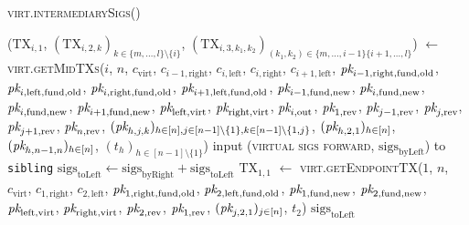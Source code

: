 \begin{center}
  \begin{processbox}{\textsc{virt.intermediarySigs}()}
    \begin{algorithmic}[1]
      \State ($\mathrm{TX}_{i, 1}$, $(\mathrm{TX}_{i, 2, k})_{k \in \{m, \dots,
      l\} \setminus \{i\}}$, $(\mathrm{TX}_{i, 3, k_1, k_2})_{(k_1, k_2) \in
      \{m, \dots, i-1\} \{i+1, \dots, l\}}$) $\gets$
      \textsc{virt.getMidTXs}($i$, $n$, $c_{\mathrm{virt}}$, $c_{i-1,
      \mathrm{right}}$, $c_{i, \mathrm{left}}$, $c_{i, \mathrm{right}}$,
      $c_{i+1, \mathrm{left}}$, $\textit{pk}_{i-1, \mathrm{right}, \mathrm{fund},
      \mathrm{old}}$, $\textit{pk}_{i, \mathrm{left}, \mathrm{fund}, \mathrm{old}}$,
      $\textit{pk}_{i, \mathrm{right}, \mathrm{fund}, \mathrm{old}}$, $\textit{pk}_{i+1,
      \mathrm{left}, \mathrm{fund}, \mathrm{old}}$, $\textit{pk}_{i-1, \mathrm{fund},
      \mathrm{new}}$, $\textit{pk}_{i, \mathrm{fund}, \mathrm{new}}$, $\textit{pk}_{i,
      \mathrm{fund}, \mathrm{new}}$, $\textit{pk}_{i+1, \mathrm{fund}, \mathrm{new}}$,
      $\textit{pk}_{\mathrm{left}, \mathrm{virt}}$, $\textit{pk}_{\mathrm{right}, \mathrm{virt}}$,
      $\textit{pk}_{i, \mathrm{out}}$, $\textit{pk}_{1, \mathrm{rev}}$, $\textit{pk}_{j-1, \mathrm{rev}}$,
      $\textit{pk}_{j, \mathrm{rev}}$, $\textit{pk}_{j+1, \mathrm{rev}}$, $\textit{pk}_{n, \mathrm{rev}}$,
      $(\textit{pk}_{h,j,k})_{h \in [n], j \in [n-1] \setminus \{1\}, k \in [n-1]
      \setminus \{1, j\}}$, $(\textit{pk}_{h, 2, 1})_{h \in [n]}$, $(\textit{pk}_{h, n-1, n})_{h
      \in [n]}$, $(t_h)_{h \in [n-1] \setminus \{1\}}$)
      \State {}
      \State input (\textsc{virtual sigs forward},
      $\mathrm{sigs}_{\mathrm{byLeft}}$) to \texttt{sibling}
      \State {}
      \State $\mathrm{sigs}_{\mathrm{toLeft}} \gets
      \mathrm{sigs}_{\mathrm{byRight}} + \mathrm{sigs}_{\mathrm{toLeft}}$
       
        \State $\mathrm{TX}_{1, 1}$ $\gets$ \textsc{virt.getEndpointTX}($1$,
        $n$, $c_{\mathrm{virt}}$, $c_{1, \mathrm{right}}$, $c_{2,
        \mathrm{left}}$, $\textit{pk}_{1, \mathrm{right}, \mathrm{fund}, \mathrm{old}}$,
        $\textit{pk}_{2, \mathrm{left}, \mathrm{fund}, \mathrm{old}}$, $\textit{pk}_{1,
        \mathrm{fund}, \mathrm{new}}$, $\textit{pk}_{2, \mathrm{fund}, \mathrm{new}}$,
        $\textit{pk}_{\mathrm{left}, \mathrm{virt}}$, $\textit{pk}_{\mathrm{right},
        \mathrm{virt}}$, $\textit{pk}_{2, \mathrm{rev}}$, $\textit{pk}_{1, \mathrm{rev}}$,
        $(\textit{pk}_{j, 2, 1})_{j \in [n]}$, $t_2$)
      \EndIf
      \State \Return $\mathrm{sigs}_{\mathrm{toLeft}}$
    \end{algorithmic}
  \end{processbox}
  \label{code:virtual-layer:intermediary-sigs}
\end{center} \ \\

